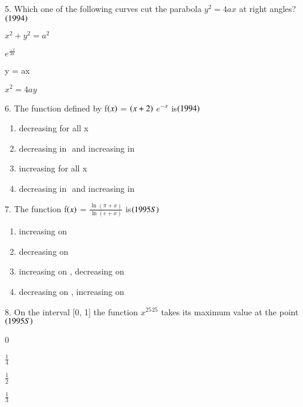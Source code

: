 \documentclass[journal,12pt,twocolumn]{IEEEtran}
\theoremstyle{remark}
\begin{document}
5. Which one of the following curves cut the \indent  parabola
$y^2 = 4ax$ at right angles?\hfill$\left(1994\right)$
\begin{enumerate}[label=\alph*.]
\begin{multicols}{2}
	\item $x^2 + y^2 = a^2$
        \item $e^{\frac{-x}{2a}}$
	\item y = ax
	\item $x^2 = 4ay$
\end{multicols}
\end{enumerate}
6.  The function defined by f$\left(x\right)$ = $\left(x+2\right)$ $e^{-x}$ 	
is\hfill$\left(1994\right)$
\begin{enumerate}[label=\alph*.]
	\item decreasing for all x
	\item decreasing in $ $$ $ and increasing
		in $ $$ $
        \item increasing for all x
	\item decreasing in $ $$ $ and increasing
		in $ $$ $\\
\end{enumerate}
7.  The function f$\left(x\right)$ = 
$\displaystyle\frac{\ln (\pi + x)}{\ln (e + x)}$ 
is\hfill$\left(1995S\right)$\\
\begin{enumerate}[label=\alph*.]
	\item increasing on $ $$ $
	\item decreasing on $ $$ $
	\item increasing on $ $$ $,
		decreasing on $ $$ $
	\item decreasing on $ $$ $,
		increasing on $ $$ $\\
\end{enumerate}
8.  On the interval [0, 1] the function $x^{25}$$^{25}$ \indent takes 
its maximum value at the point\hfill$\left(1995S\right)$
\begin{enumerate}[label=\alph*.]
\begin{multicols}{4}
	\item 0 
	\item $\displaystyle\frac{1}{4}$ 
	\item $\displaystyle\frac{1}{2}$ 
        \item $\displaystyle\frac{1}{3}$
\end{multicols}
\end{enumerate}
\newpage
\bigskip
\renewcommand{\thefigure}
{\theenumi}
\renewcommand{\thetable}
{\theenumi}
\end{document}

